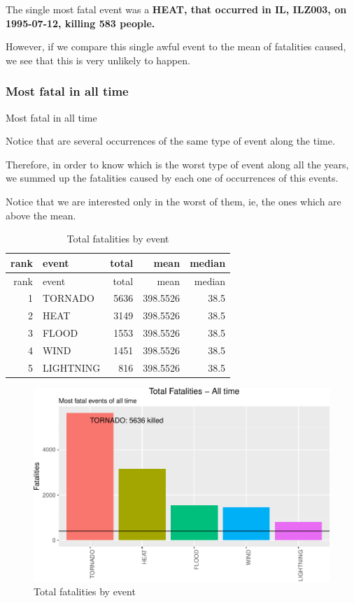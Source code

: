 The single most fatal event was a \textbf{HEAT, that occurred in IL,
ILZ003, on 1995-07-12, killing 583 people.}

However, if we compare this single awful event to the mean of fatalities
caused, we see that this is very unlikely to happen.

\subsubsection{Most fatal in all time}\label{most-fatal-in-all-time}

Most fatal in all time

Notice that are several occurrences of the same type of event along the
time.

Therefore, in order to know which is the worst type of event along all
the years, we summed up the fatalities caused by each one of occurrences
of this events.

Notice that we are interested only in the worst of them, ie, the ones
which are above the mean.

\begin{longtable}[]{@{}rlrrr@{}}
\caption{Total fatalities by event}\tabularnewline
\toprule
rank & event & total & mean & median\tabularnewline
\midrule
\endfirsthead
\toprule
rank & event & total & mean & median\tabularnewline
\midrule
\endhead
1 & TORNADO & 5636 & 398.5526 & 38.5\tabularnewline
2 & HEAT & 3149 & 398.5526 & 38.5\tabularnewline
3 & FLOOD & 1553 & 398.5526 & 38.5\tabularnewline
4 & WIND & 1451 & 398.5526 & 38.5\tabularnewline
5 & LIGHTNING & 816 & 398.5526 & 38.5\tabularnewline
\bottomrule
\end{longtable}

\suppressfloats\begin{figure}[htbp]
\centering
\includegraphics{readme_files/figure-latex/fatal-plot-alltime-1.pdf}
\caption{Total fatalities by event}
\end{figure}

